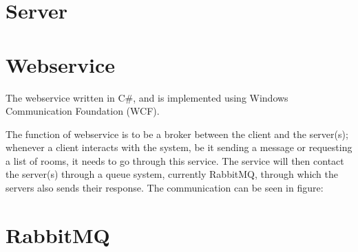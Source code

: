 \section{Server}

\section{Webservice}
The webservice written in C\#, and is implemented using Windows Communication Foundation (WCF). 

The function of webservice is to be a broker between the client and the server(s); whenever a client interacts with the system, be it sending a message or requesting a list of rooms, it needs to go through this service. The service will then  contact the server(s) through a queue system, currently RabbitMQ, through which the servers also sends their response. The communication can be seen in figure:



\section{RabbitMQ}